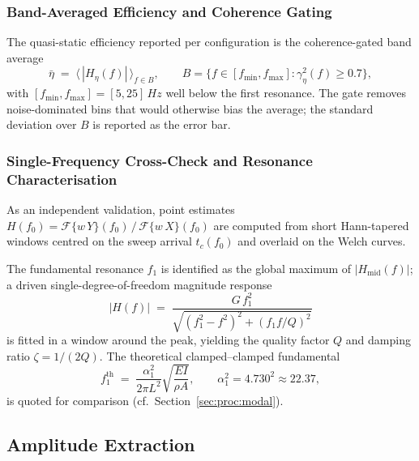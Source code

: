 \subsubsection{Band-Averaged Efficiency and Coherence Gating}
The quasi-static efficiency reported per configuration is the coherence-gated
band average
\begin{equation}
  \bar\eta \;=\; \bigl\langle\, |H_\eta(f)| \,\bigr\rangle_{f \in B},
  \qquad
  B = \{ f \in [f_\mathrm{min}, f_\mathrm{max}] :
         \gamma^2_\eta(f) \ge 0.7 \},
  \label{eq:bandeta}
\end{equation}
with $[f_\mathrm{min}, f_\mathrm{max}] = [5, 25]\,\si{Hz}$ well below the
first resonance. The gate removes noise-dominated bins that would otherwise
bias the average; the standard deviation over $B$ is reported as the error
bar.

\subsubsection{Single-Frequency Cross-Check and Resonance Characterisation}
As an independent validation, point estimates
$H(f_0) = \mathcal{F}\{w\,Y\}(f_0)\,/\,\mathcal{F}\{w\,X\}(f_0)$ are computed
from short Hann-tapered windows centred on the sweep arrival $t_c(f_0)$ and
overlaid on the Welch curves.

The fundamental resonance $f_1$ is identified as the global maximum of
$|H_\mathrm{mid}(f)|$; a driven single-degree-of-freedom magnitude response
\begin{equation}
  |H(f)| \;=\; \frac{G\, f_1^2}
   {\sqrt{\left(f_1^2 - f^2\right)^2 + \left(f_1 f / Q\right)^2}}
  \label{eq:sdof}
\end{equation}
is fitted in a window around the peak, yielding the quality factor $Q$ and
damping ratio $\zeta = 1/(2Q)$. The theoretical clamped--clamped fundamental
\begin{equation}
  f_1^\mathrm{th} \;=\; \frac{\alpha_1^2}{2\pi L^2}\sqrt{\frac{EI}{\rho A}},
  \qquad \alpha_1^2 = 4.730^2 \approx 22.37,
  \label{eq:f1theory}
\end{equation}
is quoted for comparison (cf.~Section~\ref{sec:proc:modal}).

\subsection{Amplitude Extraction}
\label{sec:proc:amplitude}

